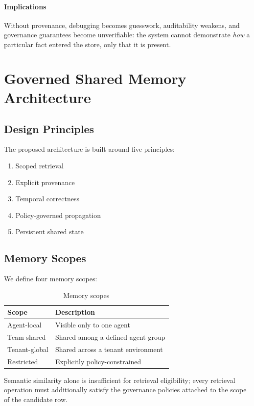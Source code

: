 \documentclass[10pt,twocolumn,letterpaper]{article}
\begin{document}
\paragraph{Implications}
Without provenance, debugging becomes guesswork, auditability weakens, and governance guarantees become unverifiable: the system cannot demonstrate \emph{how} a particular fact entered the store, only that it is present.

\section{Governed Shared Memory Architecture}

\subsection{Design Principles}

The proposed architecture is built around five principles:
\begin{enumerate}
    \item Scoped retrieval
    \item Explicit provenance
    \item Temporal correctness
    \item Policy-governed propagation
    \item Persistent shared state
\end{enumerate}

\subsection{Memory Scopes}

We define four memory scopes:

\begin{table}[H]
\centering
\caption{Memory scopes}
\begin{tabular}{ll}
\toprule
Scope & Description \\
\midrule
Agent-local & Visible only to one agent \\
Team-shared & Shared among a defined agent group \\
Tenant-global & Shared across a tenant environment \\
Restricted & Explicitly policy-constrained \\
\bottomrule
\end{tabular}
\end{table}

Semantic similarity alone is insufficient for retrieval eligibility; every retrieval operation must additionally satisfy the governance policies attached to the scope of the candidate row.
\end{document}
